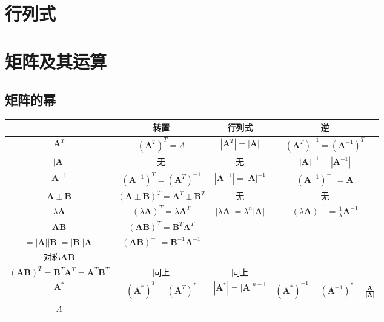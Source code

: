 \documentclass[UTF8,a4paper,12pt,scheme=chinese]{ctexbook}
\newcommand{\jz}[1]{\boldsymbol{#1}}
\begin{document}
	\chapter{行列式}
	\chapter{矩阵及其运算}
	\section{矩阵的幂}
	\begin{longtable}{|c|c|c|c|}
		\hline 
		 & 转置 & 行列式 & 逆 
		\\\hline  
		$ \jz{A}^T $ & $ (\jz{A}^T)^T=A $ & $ |\jz{A}^T|=|\jz{A}| $ & $ (\jz{A}^T)^{-1} = (\jz{A}^{-1})^T $ 
		\\\hline 
		$ |\jz{A}| $ & 无  & 无 & $ |\jz{A}|^{-1}=|\jz{A}^{-1}| $
		\\\hline
		$ \jz{A}^{-1} $ & $ (\jz{A}^{-1})^T = (\jz{A}^T)^{-1} $ & $ |\jz{A}^{-1}|=|\jz{A}|^{-1} $ & $ (\jz{A}^{-1})^{-1}=\jz{A} $
		\\\hline
		$ \jz{A}\pm\jz{B} $ & $ (\jz{A}\pm\jz{B})^T=\jz{A}^T\pm\jz{B}^T $ & 无 & 无
		\\\hline
		$ \lambda\jz{A} $ & $ (\lambda\jz{A})^T=\lambda\jz{A}^T $ & $ |\lambda\jz{A}|=\lambda^n|\jz{A}| $ & $ (\lambda\jz{A})^{-1}=\frac{1}{\lambda}\jz{A}^{-1} $
		\\\hline
		$ \jz{A}\jz{B} $ & $ (\jz{A}\jz{B})^T=\jz{B}^T\jz{A}^T $ &
		\makecell{$ |\jz{A}\jz{B}|=|\jz{B}\jz{A}|$\\$=|\jz{A}||\jz{B}|=|\jz{B}||\jz{A}| $} 
		& $ (\jz{A}\jz{B})^{-1}=\jz{B}^{-1}\jz{A}^{-1} $
		\\\hline
		对称$ \jz{A}\jz{B} $ & \makecell{$ (\jz{A}\jz{B})^T=\jz{A}\jz{B}=\jz{B}\jz{A} $\\$ (\jz{A}\jz{B})^T=\jz{B}^T\jz{A}^T=\jz{A}^T\jz{B}^T $}&同上&同上
		\\\hline
		$ \jz{A}^* $ & $ (\jz{A}^*)^T=(\jz{A}^T)^* $ & $ |\jz{A}^*|=|\jz{A}|^{n-1} $ & $ (\jz{A}^*)^{-1}=(\jz{A}^{-1})^*=\frac{\jz{A}}{|\jz{A}|} $
		\\\hline
		$ \jz{\varLambda} $ &&&
		\\\hline
	\end{longtable}
\end{document}
